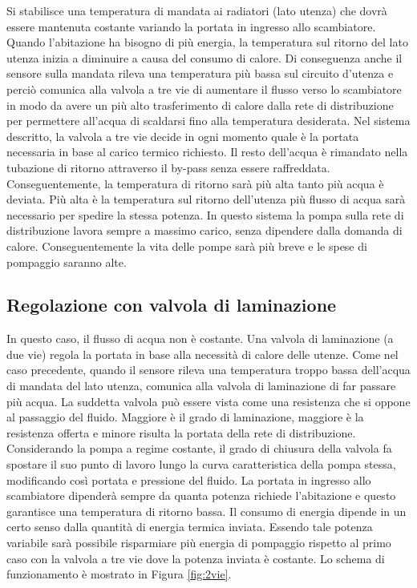 \documentclass[laurea,oneside,11pt]{USiena_tesiLM3}
\begin{document}
Si stabilisce una temperatura di mandata ai radiatori (lato utenza) che dovrà essere mantenuta costante variando la portata in ingresso allo scambiatore. Quando l'abitazione ha bisogno di più energia, la temperatura sul ritorno del lato utenza inizia a diminuire a causa del consumo di calore. Di conseguenza anche il sensore sulla mandata rileva una temperatura più bassa sul circuito d'utenza  e perciò comunica alla valvola a tre vie di aumentare il flusso verso lo scambiatore in modo da avere un più alto trasferimento di calore dalla rete di distribuzione per permettere all'acqua di scaldarsi fino alla temperatura desiderata.
Nel sistema descritto, la valvola a tre vie decide in ogni momento quale è la portata necessaria in base al carico termico richiesto. Il resto dell'acqua è rimandato nella tubazione di ritorno attraverso il by-pass senza essere raffreddata. Conseguentemente, la temperatura di ritorno sarà più alta tanto più acqua è deviata. Più alta è la temperatura sul ritorno dell'utenza     più flusso di acqua sarà necessario per spedire la stessa potenza. In questo sistema la pompa sulla rete di distribuzione lavora sempre a massimo carico, senza dipendere dalla domanda di calore. Conseguentemente la vita delle pompe sarà più breve e le spese di pompaggio saranno alte.

\subsection{Regolazione con valvola di laminazione}
\label{subsec:2vie}
In questo caso, il flusso di acqua non è costante. Una valvola di laminazione (a due vie) regola la portata in base alla necessità di calore delle utenze. 
Come nel caso precedente, quando il sensore rileva una temperatura troppo bassa dell'acqua di mandata del lato utenza, comunica alla valvola di laminazione di far passare più acqua. 
La suddetta valvola può essere vista come una resistenza che si oppone al passaggio del fluido. Maggiore è il grado di laminazione, maggiore è la resistenza offerta e minore risulta la portata della rete di distribuzione. Considerando la pompa a regime costante, il grado di chiusura della valvola fa spostare il suo punto di lavoro lungo la curva caratteristica della pompa stessa, modificando così portata e pressione del fluido.
La portata in ingresso allo scambiatore dipenderà sempre da quanta potenza richiede l'abitazione e questo garantisce una temperatura di ritorno bassa. 
Il consumo di energia dipende in un certo senso dalla quantità di energia termica inviata. Essendo tale potenza variabile sarà possibile risparmiare più energia di pompaggio rispetto al primo caso con la valvola a tre vie dove la potenza inviata è costante. Lo schema di funzionamento è mostrato in Figura \ref{fig:2vie}.
\end{document}
